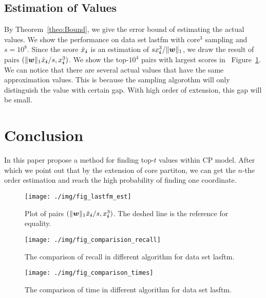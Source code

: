 \documentclass[letterpaper]{article}
\newcommand{\V}[1]{{\boldsymbol{{\MakeLowercase{#1}}}}}
\newcommand{\norm}[2]{\|#1\|_{#2}}
\newcommand{\Fig}[1]{Figure~\ref{fig:#1}}
\newcommand{\Theo}[1]{Theorem~\ref{theo:#1}}
\begin{document}
\subsection{Estimation of Values}
By \Theo{Bound}, we give the error bound of estimating the actual values.
We show the performance on data set lastfm with core$^3$ sampling and $s=10^8$.
Since the score $\hat{x}_{\V{i}}$ is an estimation of $sx^3_{\V{i}}/\norm{\V{w}}{1}$,
we draw the result of pairs $(\norm{\V{w}}{1}\hat{x}_{\V{i}}/s,x^3_{\V{i}})$.
We show the top-$10^4$ pairs with largest scores in ~\Fig{Est}.
We can notice that there are several actual values that have the same approximation values.
This is because the sampling algorothm will only distinguish the value with certain gap.
With high order of extension, this gap will be small. 
\section{Conclusion}
In this paper propose a method for finding top-$t$ values within CP model.
After which we point out that by the extension of core partiton, 
we can get the $n$-the order estimation and reach the high probability of finding one coordinate.
\begin{figure}[ht]
  \centering
  \texttt{[image: ./img/fig\_lastfm\_est]}\\
  \caption{Plot of pairs $(\norm{\V{w}}{1}\hat{x}_{\V{i}}/s,x^3_{\V{i}})$.
          The deshed line is the reference for equality.}
  \label{fig:Est}
\end{figure}

\begin{figure}[ht]
  \centering
  \texttt{[image: ./img/fig\_comparision\_recall]}\\
  \caption{The comparison of recall in different algorithm for data set lasftm.}
  \label{fig:Comparison_recall}
\end{figure}

\begin{figure}[ht]
    \centering
    \texttt{[image: ./img/fig\_comparison\_times]}\\
    \caption{The comparison of time in different algorithm for data set lasftm.}
\label{fig:Comparison_time}
\end{figure}




\end{document}
